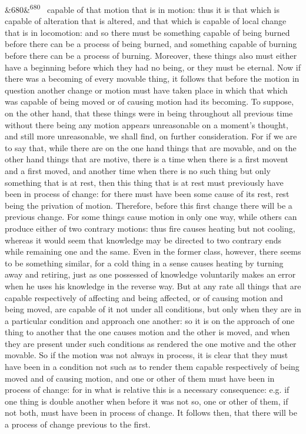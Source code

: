 \documentclass[12pt]{article}
\newcommand{\para}[1][]{\par\noindent\ifx&#1&\else\textsuperscript{\footnotesize #1}~\fi}
\begin{document}
\para[680] capable of that motion that is in motion: thus it is that which is capable of alteration that is altered, and that which is capable of local change that is in locomotion: and so there must be something capable of being burned before there can be a process of being burned, and something capable of burning before there can be a process of burning. Moreover, these things also must either have a beginning before which they had no being, or they must be eternal. Now if there was a becoming of every movable thing, it follows that before the motion in question another change or motion must have taken place in which that which was capable of being moved or of causing motion had its becoming. To suppose, on the other hand, that these things were in being throughout all previous time without there being any motion appears unreasonable on a moment's thought, and still more unreasonable, we shall find, on further consideration. For if we are to say that, while there are on the one hand things that are movable, and on the other hand things that are motive, there is a time when there is a first movent and a first moved, and another time when there is no such thing but only something that is at rest, then this thing that is at rest must previously have been in process of change: for there must have been some cause of its rest, rest being the privation of motion. Therefore, before this first change there will be a previous change. For some things cause motion in only one way, while others can produce either of two contrary motions: thus fire causes heating but not cooling, whereas it would seem that knowledge may be directed to two contrary ends while remaining one and the same. Even in the former class, however, there seems to be something similar, for a cold thing in a sense causes heating by turning away and retiring, just as one possessed of knowledge voluntarily makes an error when he uses his knowledge in the reverse way. But at any rate all things that are capable respectively of affecting and being affected, or of causing motion and being moved, are capable of it not under all conditions, but only when they are in a particular condition and approach one another: so it is on the approach of one thing to another that the one causes motion and the other is moved, and when they are present under such conditions as rendered the one motive and the other movable. So if the motion was not always in process, it is clear that they must have been in a condition not such as to render them capable respectively of being moved and of causing motion, and one or other of them must have been in process of change: for in what is relative this is a necessary consequence: e.g. if one thing is double another when before it was not so, one or other of them, if not both, must have been in process of change. It follows then, that there will be a process of change previous to the first.
\end{document}
